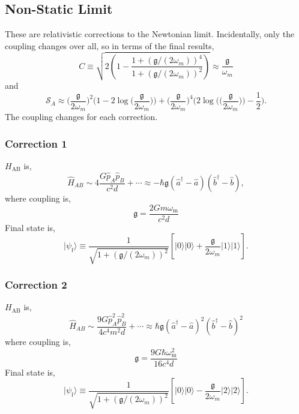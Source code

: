 \documentclass[11pt]{article}
\begin{document}
\subsection{Non-Static Limit}
These are relativistic corrections to the Newtonian limit. Incidentally, only the coupling changes over all, so in terms of the final results,
\begin{equation}
C\equiv\sqrt{2(1-\frac{1+(\mathfrak{g}/(2\omega_{m}))^{4}}{1+(\mathfrak{g}/(2\omega_{m}))^{2}})}\approx\frac{\mathfrak{g}}{\omega_{m}}
\end{equation}
and
\begin{equation}
    \mathcal{S}_A \approx \Big(\frac{\mathfrak{g}}{2\omega_{m}}\Big)^2 \Big(1 - 2\log\Big(\frac{\mathfrak{g}}{2\omega_{m}}\Big)\Big) + \Big(\frac{\mathfrak{g}}{2\omega_{m}}\Big)^4 \Big(2\log\Big(\Big(\frac{\mathfrak{g}}{2\omega_{m}}\Big)\Big) - \frac{1}{2}\Big).
\end{equation}
The coupling changes for each correction.
\subsubsection{Correction 1}
$H_{\text{AB}}$ is,
\begin{equation}
\hat{H}_{AB}\sim4\frac{G\hat{p}_{A}\hat{p}_{B}}{c^{2}d}+\cdots \approx -\hbar\mathfrak{g}(\hat{a}^{\dagger}-\hat{a})(\hat{b}^{\dagger}-\hat{b}),
\end{equation}
where coupling is,
\begin{equation}
\mathfrak{g}=\frac{2Gm\omega_{\text{m}}}{c^{2}d}
\end{equation}
Final state is,
\begin{equation}
\vert\psi_{\text{f}}\rangle\equiv\frac{1}{\sqrt{1+(\mathfrak{g}/(2\omega_{m}))^{2}}}[\vert0\rangle\vert0\rangle+\frac{\mathfrak{g}}{2\omega_{m}}\vert1\rangle\vert1\rangle].
\end{equation}

\subsubsection{Correction 2}
$H_{\text{AB}}$ is,
\begin{equation}
\hat{H}_{AB}\sim\frac{9G\hat{p}_{A}^{2}\hat{p}_{B}^{2}}{4c^{4}m^{2}d}+\cdots\approx\hbar\mathfrak{g}(\hat{a}^{\dagger}-\hat{a})^{2}(\hat{b}^{\dagger}-\hat{b})^{2}
\end{equation}
where coupling is,
\begin{equation}
\mathfrak{g}=\frac{9G\hbar\omega_{\text{m}}^{2}}{16c^{4}d}
\end{equation}
Final state is,
\begin{equation}
\vert\psi_{\text{f}}\rangle\equiv\frac{1}{\sqrt{1+(\mathfrak{g}/(2\omega_{m}))^{2}}}[\vert0\rangle\vert0\rangle-\frac{\mathfrak{g}}{2\omega_{m}}\vert2\rangle\vert2\rangle].
\end{equation}
\end{document}
